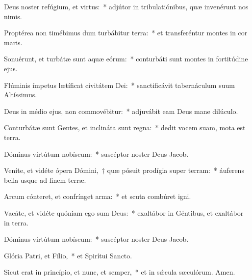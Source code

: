 \item Deus noster refúgium, et virtus:~* adjútor in tribulatiónibus, quæ invenérunt nos nimis.

\item Proptérea non timébimus dum turbábitur terra:~* et transferéntur montes in cor maris.

\item Sonuérunt, et turbátæ sunt aquæ eórum:~* conturbáti sunt montes in fortitúdine ejus.

\item Flúminis ímpetus lætíficat civitátem Dei:~* sanctificávit tabernáculum suum Altíssimus.

\item Deus in médio ejus, non commovébitur:~* adjuvábit eam Deus mane dilúculo.

\item Conturbátæ sunt Gentes, et inclináta sunt regna:~* dedit vocem suam, mota est terra.

\item Dóminus virtútum nobíscum:~* suscéptor noster Deus Jacob.

\item Veníte, et vidéte ópera Dómini,~† quæ pósuit prodígia super terram:~* áuferens bella usque ad finem terræ.

\item Arcum cónteret, et confrínget arma:~* et scuta combúret igni.

\item Vacáte, et vidéte quóniam ego sum Deus:~* exaltábor in Géntibus, et exaltábor in terra.

\item Dóminus virtútum nobíscum:~* suscéptor noster Deus Jacob.

\item Glória Patri, et Fílio,~* et Spirítui Sancto.

\item Sicut erat in princípio, et nunc, et semper,~* et in sǽcula sæculórum. Amen.


